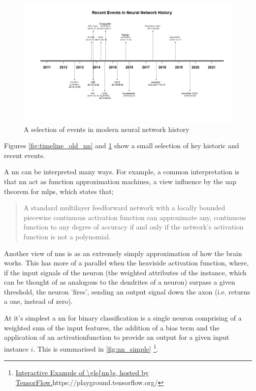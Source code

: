 \begin{figure}
    \centering
    \includegraphics[width=140mm,scale=1.5]{figs/timeline_new_nn.png}
    \caption{A selection of events in modern neural network history}
    \label{fig:timeline_new_nn}
\end{figure}

Figures \ref{fig:timeline_old_nn} and \ref{fig:timeline_new_nn} show a small selection of key historic and recent events. 

A \gls{nn} can be interpreted many ways. For example, a common interpretation is that \gls{nn} act as function approximation machines, a view influence by the \gls{uap} theorem for \gls{mlp}s, which states that;

\begin{quote}
    A standard multilayer feedforward network with a locally bounded piecewise continuous activation function can approximate any, continuous function to any degree of accuracy if and only if the network's activation function is not a polynomial.\cite{uap_mlp}
\end{quote}

Another view of \gls{nn}s is as an extremely simply approximation of how the brain works. This has more of a parallel when the heaviside activation function, where, if the input signals of the neuron (the weighted attributes of the \gls{instance}, which can be thought of as analogous to the dendrites of a neuron) surpass a given threshold, the neuron 'fires', sending an output signal down the axon (i.e. returns a one, instead of zero).
\bigskip

At it's simplest a \gls{nn} for binary classification is a single \gls{neuron} comprising of a weighted sum of the input features, the addition of a bias term and the application of an \gls{activationfunction} to provide an output for a given input \gls{instance} $i$. This is summarised in \ref{fig:nn_simple} \footnote{\url{Interactive Example of \gls{nn}s, hosted by TensorFlow.}{https://playground.tensorflow.org/}}.  

